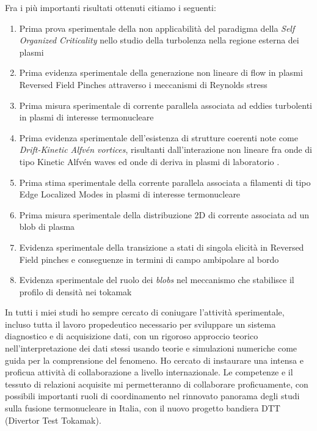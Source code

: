 Fra i pi{\`u} importanti risultati ottenuti citiamo i seguenti:
\begin{enumerate}[itemsep=0.05ex, label=\textbf{\roman*}]
\item Prima prova sperimentale della non applicabilit{\`a} del
  paradigma della \emph{Self
    Organized Criticality} nello studio della turbolenza nella regione
  esterna dei plasmi \parencite{Spada:2001p3574,Antoni:2001p3221}
\item Prima evidenza sperimentale della generazione non lineare di
  flow in plasmi Reversed Field Pinches attraverso i meccanismi di
  Reynolds stress \parencite{Vianello:2005p1976,Vianello:2005p2671}
\item Prima misura sperimentale di corrente parallela associata ad
  eddies turbolenti in plasmi di interesse termonucleare \parencite{Spolaore:2009p4115} 
\item Prima evidenza sperimentale dell'esistenza di strutture coerenti
  note come \emph{Drift-Kinetic Alfv\'en
    vortices}, risultanti dall'interazione non lineare fra onde di
  tipo 
  Kinetic Alfv\'en waves ed onde di deriva in plasmi di laboratorio
  \parencite{Vianello:2010p4670}.
\item Prima stima sperimentale della corrente parallela associata a
  filamenti di tipo Edge Localized Modes in plasmi di interesse termonucleare \parencite{PhysRevLett.106.125002}
\item Prima misura sperimentale della distribuzione 2D di corrente
  associata ad un blob di plasma \parencite{Furno:2011cs}
\item Evidenza sperimentale della transizione a stati di singola
  elicit{\`a} in Reversed Field pinches
  \parencite{Lorenzini:2009p4248} e conseguenze in termini di campo
  ambipolare al bordo \parencite{Spizzo:2014jn}
\item Evidenza sperimentale del ruolo dei \emph{blobs} nel meccanismo
  che stabilisce il profilo di densit{\`a} nei tokamak \parencite{Carralero:prl2015, Vianello:2017ku}
\end{enumerate}
In tutti i miei studi ho sempre cercato di coniugare l'attivit{\`a}
sperimentale, incluso tutta il lavoro propedeutico necessario per
sviluppare un sistema diagnostico e di acquisizione dati, con un
rigoroso approccio teorico nell'interpretazione dei dati stessi usando
teorie e simulazioni numeriche come guida per la comprensione del
fenomeno. Ho cercato di instaurare una intensa e proficua attivit{\`a}
di collaborazione a livello internazionale.  Le competenze e il
tessuto di relazioni acquisite
mi permetteranno di collaborare proficuamente, con possibili
importanti ruoli di
coordinamento nel rinnovato panorama
degli studi sulla fusione termonucleare in Italia, con il nuovo
progetto bandiera DTT (Divertor Test Tokamak).\\
